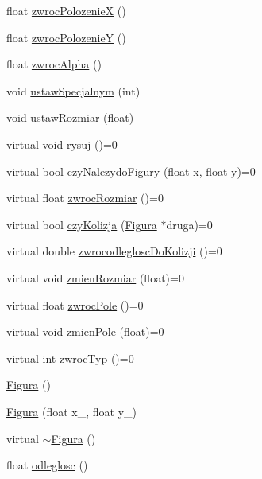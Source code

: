 \begin{DoxyCompactItemize}
\item 
float \hyperlink{classFigura_a009283dfbe0ed4e538c6fc857c544f29}{zwroc\-Polozenie\-X} ()
\item 
float \hyperlink{classFigura_aba4eb260f9d5f7ff7a52e9eb8fc99f5c}{zwroc\-Polozenie\-Y} ()
\item 
float \hyperlink{classFigura_a3cfd45edd89e226a1fb44d8f4d3f7a56}{zwroc\-Alpha} ()
\item 
void \hyperlink{classFigura_aef7fbdf672096d76336a460bcfb3108a}{ustaw\-Specjalnym} (int)
\item 
void \hyperlink{classFigura_ac5df5b70874e675dc1463b8ddc68612b}{ustaw\-Rozmiar} (float)
\item 
virtual void \hyperlink{classFigura_a6ec035fbeb95129af6ca64d2adff7651}{rysuj} ()=0
\item 
virtual bool \hyperlink{classFigura_a14f9ba21828b6292488e1fa12bf1b85f}{czy\-Nalezydo\-Figury} (float \hyperlink{classFigura_ad640a05ebb1ddbf595124f0b31793e8a}{x}, float \hyperlink{classFigura_ab17e5953f2898eb729b2dc506640bce2}{y})=0
\item 
virtual float \hyperlink{classFigura_aaeb587028aafd028e134079c249b0c88}{zwroc\-Rozmiar} ()=0
\item 
virtual bool \hyperlink{classFigura_a7a1cb0014aaaa276f8b17932c394b485}{czy\-Kolizja} (\hyperlink{classFigura}{Figura} $\ast$druga)=0
\item 
virtual double \hyperlink{classFigura_a3e534b43a279aeec36c5b28ac731e0f8}{zwrocodleglosc\-Do\-Kolizji} ()=0
\item 
virtual void \hyperlink{classFigura_a7ea2c8b450129878f4347404b8834c6b}{zmien\-Rozmiar} (float)=0
\item 
virtual float \hyperlink{classFigura_a78861f3fce7e615ba30b47aa1cdcebec}{zwroc\-Pole} ()=0
\item 
virtual void \hyperlink{classFigura_aad1198cc826aa6b3036454fd4f3bb5b3}{zmien\-Pole} (float)=0
\item 
virtual int \hyperlink{classFigura_ab04732de63f17d4c3776990d24897db7}{zwroc\-Typ} ()=0
\item 
\hyperlink{classFigura_a6977c7f0438c11b985a9a74c208b51c8}{Figura} ()
\item 
\hyperlink{classFigura_a9597f3d418eda29436184422e6347518}{Figura} (float x\-\_\-, float y\-\_\-)
\item 
virtual \hyperlink{classFigura_a80761a9b9f258fac7c22c3dd5ebf5820}{$\sim$\-Figura} ()
\item 
float \hyperlink{classFigura_a8221a03216b76b37e11a7e258b2e6b1f}{odleglosc} ()

\end{DoxyCompactItemize}
